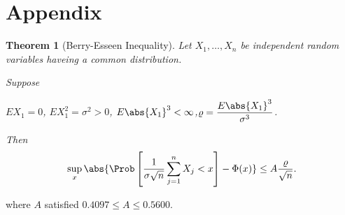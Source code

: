 \documentclass[12pt]{amsart}
\newtheorem{theorem}{Theorem}
\begin{document}
\section*{Appendix}
\begin{theorem}[Berry-Esseen Inequality] \label{BE} Let $X_1,\dots,X_n$ be independent random variables haveing a common distribution.

Suppose
\begin{center}
 $EX_1=0$, \quad $EX^2_1=\sigma^2>0$, \quad $E\abs{X_1}^3<\infty$,\quad$\varrho=\displaystyle\frac{E\abs{X_1}^3}{\sigma^3}$.
\end{center}
Then
\[
\sup_x\abs{\Prob\left[\frac{1}{\sigma\sqrt{n}}\sum_{j=1}^{n}{X_j}<x \right]-\Phi(x)}\leq A\frac{\varrho}{\sqrt{n}}.
\]
\end{theorem}
where $A$ satisfied $0.4097\leq A\leq 0.5600$.
\end{document}
